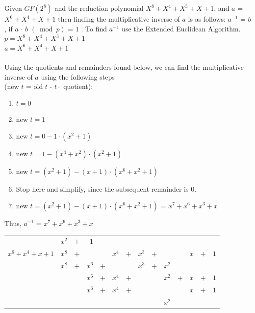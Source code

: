 \begin{eg} Given $GF(2^8)$ and the reduction polynomial $X^8 + X^4 + X^3 + X +1$, and $a$ = $X^6 + X^4 + X + 1$ then finding the multiplicative inverse of $a$ is as follows:  $a^{-1}$ = $b$, if $a$ $\cdot$ $b$ $(\bmod p)$ = $1$ .  To find $a^{-1}$ use the Extended Euclidean Algorithm.
\\
	$p =  X^8 + X^4 + X^3 + X +1$\\ 
	$a = X^6 + X^4 + X + 1$\\
\\Using the quotients and remainders found below, we can find the multiplicative inverse of $a$ using the following steps \\(new $t$ = old $t$ - $t \cdot$ quotient):
\begin{enumerate}
\item $t = 0$
\item new $ t = 1$ 
\item new $t = 0 - 1\cdot(x^2 + 1)$
\item  new $t = 1 - (x^4 + x^2)\cdot(x^2 + 1)$
\item new $t = (x^2 + 1) - (x+1)\cdot(x^6 + x^2 + 1)$
\item Stop here and simplify, since the subsequent remainder is 0.
\item new $t = (x^2 + 1) - (x+1)\cdot(x^6 + x^2 + 1)$ = $x^7 + x^6 + x^3 + x$
\end{enumerate}
Thus, $a^{-1}$ = $x^7 + x^6 + x^3 + x$\\
\begin{center}
\begin{tabular}{rrcrcrcrcrcrcr}
        &  $x^2$  &  $+$  &      $1$         \\ \cline{2-14}
 \multicolumn{1}{r|}{$x^6 + x^4 + x + 1$}
        &  $x^8$  &  $+$  &    &      &  $x^4$  &  $+$  & $ x^3$  &  $+$  &   &   & $ x$  &  $+$  &  $1$  \\
        & $x^8$   &  $+$  &    $x^6$      &    $+$         &      &     &  $x^3$  &  $+$  & $x^2$        \\ \cline{2-14}
        &         &              &$x^6$ &$+$ &  $x^4$  & $+$   &              &          & $ x^2$  &   $+$  & $x$   &  $+$  & $1$       \\
        &         &              &$x^6$ &$+$ &  $x^4$  & $+$   &              &          &   &    & $x$   &  $+$  & $1$   \\ \cline{4-14}
        &         &               &          &      &             &           &       &     & $x^2$ 
\end{tabular}
\end{center}


\end{eg}

